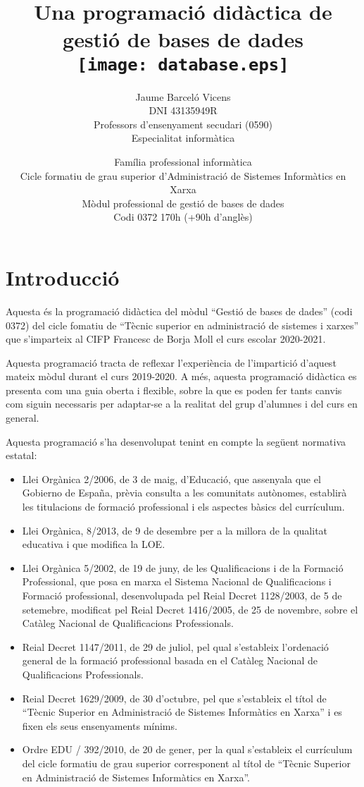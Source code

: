 \documentclass[catalan, a4paper, 12pt, titlepage]{article}
\title{Una programació didàctica de \\
gestió de bases de dades\\
	\texttt{[image: database.eps]}
	}
\author{
	Jaume Barceló Vicens\\
	DNI 43135949R\\
	Professors d'ensenyament secudari (0590)\\
	Especialitat informàtica}
\date{
	Família professional informàtica \\
	Cicle formatiu de grau superior d’Administració de Sistemes Informàtics en Xarxa\\
	Mòdul professional de gestió de bases de dades\\
	Codi 0372 170h (+90h d'anglès)}
\begin{document}
\maketitle

\tableofcontents 

\section{Introducció}

Aquesta és la programació didàctica del mòdul ``Gestió de bases de dades'' (codi 0372) del cicle fomatiu de ``Tècnic superior en administració de sistemes i xarxes'' que s'imparteix al CIFP Francesc de Borja Moll el curs escolar 2020-2021.

Aquesta programació tracta de reflexar l'experiència de l'impartició d'aquest mateix mòdul durant el curs 2019-2020. A més, aquesta programació didàctica es presenta com una guia oberta i flexible, sobre la que es poden fer tants canvis com siguin necessaris per adaptar-se a la realitat del grup d'alumnes i del curs en general.

Aquesta programació s'ha desenvolupat tenint en compte la següent normativa estatal:
\begin{itemize}
	\item Llei Orgànica 2/2006, de 3 de maig, d'Educació, que assenyala que el Gobierno de España, prèvia consulta a les comunitats autònomes, establirà les titulacions de formació professional i els aspectes bàsics del currículum.
	\item Llei Orgànica, 8/2013, de 9 de desembre per a la millora de la qualitat educativa i que modifica la LOE.
	\item Llei Orgànica 5/2002, de 19 de juny, de les Qualificacions i de la Formació Professional, que posa en marxa el Sistema Nacional de Qualificacions i Formació professional, desenvolupada pel Reial Decret 1128/2003, de 5 de setemebre, modificat pel Reial Decret 1416/2005, de 25 de novembre, sobre el Catàleg Nacional de Qualificacions Professionals.
	\item Reial Decret 1147/2011, de 29 de juliol, pel qual s'estableix l'ordenació general de la formació professional basada en el Catàleg Nacional de Qualificacions Professionals.
	\item Reial Decret 1629/2009, de 30 d'octubre, pel que s'estableix el títol de ``Tècnic Superior en Administració de Sistemes Informàtics en Xarxa'' i es fixen els seus ensenyaments mínims.
	\item Ordre EDU / 392/2010, de 20 de gener, per la qual s'estableix el currículum del cicle formatiu de grau superior corresponent al títol de ``Tècnic Superior en Administració de Sistemes Informàtics en Xarxa''.
\end{itemize}
\end{document}
